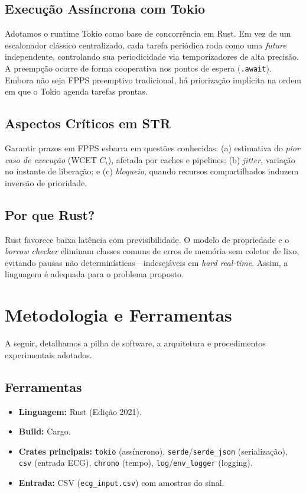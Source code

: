 \documentclass[conference]{IEEEtran}
\begin{document}
\subsection{Execução Assíncrona com Tokio}
Adotamos o runtime Tokio como base de concorrência em Rust. Em vez de um escalonador clássico centralizado, cada tarefa periódica roda como uma \emph{future} independente, controlando sua periodicidade via temporizadores de alta precisão. A preempção ocorre de forma cooperativa nos pontos de espera (\texttt{.await}). Embora não seja FPPS preemptivo tradicional, há priorização implícita na ordem em que o Tokio agenda tarefas prontas.

\subsection{Aspectos Críticos em STR}
Garantir prazos em FPPS esbarra em questões conhecidas: (a) estimativa do \emph{pior caso de execução} (WCET $C_i$), afetada por caches e pipelines; (b) \emph{jitter}, variação no instante de liberação; e (c) \emph{bloqueio}, quando recursos compartilhados induzem inversão de prioridade.

\subsection{Por que Rust?}
Rust favorece baixa latência com previsibilidade. O modelo de propriedade e o \emph{borrow checker} eliminam classes comuns de erros de memória sem coletor de lixo, evitando pausas não determinísticas---indesejáveis em \emph{hard real-time}. Assim, a linguagem é adequada para o problema proposto.

\section{Metodologia e Ferramentas}
A seguir, detalhamos a pilha de software, a arquitetura e procedimentos experimentais adotados.

\subsection{Ferramentas}
\begin{itemize}
    \item \textbf{Linguagem:} Rust (Edição 2021).
    \item \textbf{Build:} Cargo.
    \item \textbf{Crates principais:} \texttt{tokio} (assíncrono), \texttt{serde}/\texttt{serde\_json} (serialização), \texttt{csv} (entrada ECG), \texttt{chrono} (tempo), \texttt{log}/\texttt{env\_logger} (logging).
    \item \textbf{Entrada:} CSV (\texttt{ecg\_input.csv}) com amostras do sinal.
\end{itemize}
\end{document}
